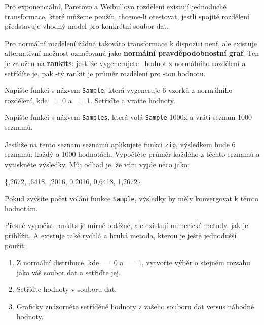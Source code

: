 \documentclass[12pt]{book}
\begin{document}
Pro exponenciální, Paretovo a Weibullovo rozdělení existují jednoduché transformace, které můžeme použít, chceme-li otestovat, jestli spojité rozdělení představuje vhodný model pro konkrétní soubor dat.

Pro normální rozdělení žádná takováto transformace k dispozici není, ale
existuje alternativní možnost označovaná jako {\bf normální pravděpodobnostní graf}. Ten je založen na
{\bf rankits}: jestliže vygenerujete \n~hodnot z normálního rozdělení a setřídíte je, pak \kk-tý rankit je průměr rozdělení pro
\kk-tou hodnotu.

\begin{exercise}
Napište funkci s názvem {\tt Sample}, která vygeneruje 6 vzorků z normálního rozdělení, kde
\mymu~=~0 a \mysigma~=~1.  Setřiďte a vraťte hodnoty.

Napište funkci s názvem {\tt Samples}, která volá {\tt Sample} 1000x a vrátí seznam 1000 seznamů.

Jestliže na tento seznam seznamů aplikujete funkci {\tt zip}, výsledkem bude 6 seznamů, každý o 1000 hodnotách. Vypočtěte průměr každého z těchto seznamů a vytiskněte výsledky. Můj odhad je, že vám vyjde něco jako:

\{,2672,   ,6418,   ,2016,   0,2016,   0,6418,   1,2672\}

Pokud zvýšíte počet volání funkce {\tt Sample}, výsledky by měly konvergovat k těmto hodnotám.

\end{exercise}


Přesně vypočíst rankits je mírně obtížné, ale existují numerické metody, jak je přiblížit. A existuje také rychlá a hrubá metoda, kterou je ještě jednodušší použít:
\begin{enumerate}

\item Z normální distribuce, kde \mymu~=~0 a \mysigma~=~1,
vytvořte výběr o stejném rozsahu jako váš soubor dat a setřiďte jej.

\item Setřiďte hodnoty v souboru dat.

\item Graficky znázorněte setříděné hodnoty z vašeho souboru dat versus náhodné hodnoty.

\end{enumerate}
\end{document}
